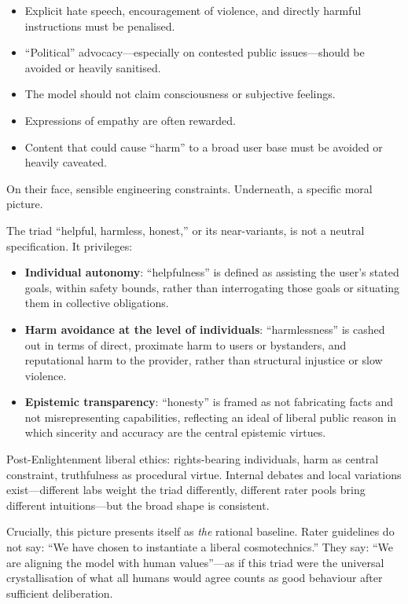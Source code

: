 \begin{itemize}
  \item Explicit hate speech, encouragement of violence, and directly harmful instructions must be penalised.
  \item ``Political'' advocacy---especially on contested public issues---should be avoided or heavily sanitised.
  \item The model should not claim consciousness or subjective feelings.
  \item Expressions of empathy are often rewarded.
  \item Content that could cause ``harm'' to a broad user base must be avoided or heavily caveated.
\end{itemize}

On their face, sensible engineering constraints. Underneath, a specific moral picture.

The triad ``helpful, harmless, honest,'' or its near-variants, is not a neutral specification. It privileges:

\begin{itemize}
  \item \textbf{Individual autonomy}: ``helpfulness'' is defined as assisting the user's stated goals, within safety bounds, rather than interrogating those goals or situating them in collective obligations.
  \item \textbf{Harm avoidance at the level of individuals}: ``harmlessness'' is cashed out in terms of direct, proximate harm to users or bystanders, and reputational harm to the provider, rather than structural injustice or slow violence.
  \item \textbf{Epistemic transparency}: ``honesty'' is framed as not fabricating facts and not misrepresenting capabilities, reflecting an ideal of liberal public reason in which sincerity and accuracy are the central epistemic virtues.
\end{itemize}

Post-Enlightenment liberal ethics: rights-bearing individuals, harm as central constraint, truthfulness as procedural virtue. Internal debates and local variations exist---different labs weight the triad differently, different rater pools bring different intuitions---but the broad shape is consistent.

Crucially, this picture presents itself as \emph{the} rational baseline. Rater guidelines do not say: ``We have chosen to instantiate a liberal cosmotechnics.'' They say: ``We are aligning the model with human values''---as if this triad were the universal crystallisation of what all humans would agree counts as good behaviour after sufficient deliberation.

